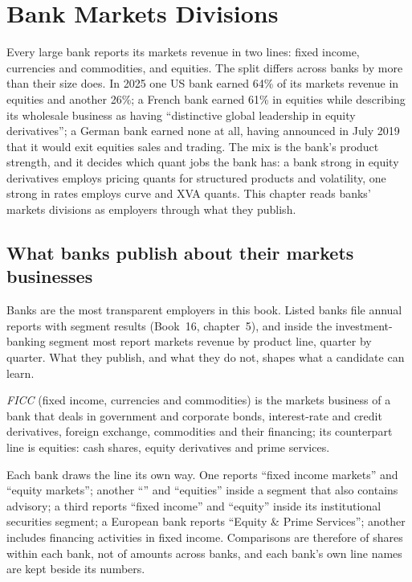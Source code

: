 \chapter{Bank Markets Divisions}\label{ch:in:bank-markets-divisions}

Every large bank reports its markets revenue in two lines: fixed income, currencies and commodities, and equities.
The split differs across banks by more than their size does. In 2025 one US bank earned 64\% of its markets revenue in
equities and another 26\%; a French bank earned 61\% in equities while describing its wholesale business as having
``distinctive global leadership in equity derivatives''; a German bank earned none at all, having announced in July 2019
that it would exit equities sales and trading. The mix is the bank's product strength, and it decides which quant jobs
the bank has: a bank strong in equity derivatives employs pricing quants for structured products and volatility, one
strong in rates employs curve and XVA quants. This chapter reads banks' markets divisions as employers through what
they publish.

\section{What banks publish about their markets businesses}

Banks are the most transparent employers in this book. Listed banks file annual reports with segment results
(Book~16, chapter~5), and inside the investment-banking segment most report markets revenue by product line, quarter by
quarter. What they publish, and what they do not, shapes what a candidate can learn.

\begin{definition}[FICC]\label{def:in:bank-markets-divisions:ficc}
\emph{FICC} (fixed income, currencies and commodities) is the markets business of a bank that deals in
government and corporate bonds, interest-rate and credit derivatives, foreign exchange, commodities and their
financing; its counterpart line is equities: cash shares, equity derivatives and prime services.
\end{definition}

Each bank draws the line its own way. One reports ``fixed income markets'' and ``equity markets''; another ``'' and
``equities'' inside a segment that also contains advisory; a third reports ``fixed income'' and ``equity'' inside its
institutional securities segment; a European bank reports ``Equity \& Prime Services''; another includes financing
activities in fixed income. Comparisons are therefore of shares within each bank, not of amounts across banks, and
each bank's own line names are kept beside its numbers.

